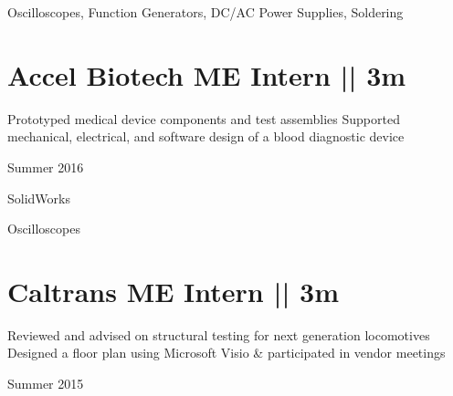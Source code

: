 {
\vspace{-2.5ex}\hspace{1.5in}
\color{cyan}\small
{Oscilloscopes, Function Generators, DC/AC Power Supplies, Soldering} %
}

\vspace{0.8ex}
\section
{\textbf{Accel Biotech}
\newline
ME Intern || 3m}

\BulletItem
\vspace{-2.5ex}
\begin{detail}
\BulletItem
Prototyped medical device components and test assemblies
\BulletItem
Supported mechanical, electrical, and software design of a blood diagnostic device
\end{detail}

\begin{subtitle}
\vspace{-7.8ex}
{{Summer 2016}}
\end{subtitle}
\vspace{0ex}

{
\vspace{0.5ex}
\color{cyan}\small
{SolidWorks} %
}

{
\vspace{-2.5ex}\hspace{3.17in}
\color{cyan}\small
{Oscilloscopes} %
}

\vspace{0.8ex}
\section
{\textbf{Caltrans}
\newline
ME Intern || 3m
\newline
}

\BulletItem
\vspace{-2.5ex}
\begin{detail}
\BulletItem
Reviewed and advised on structural testing for next generation locomotives
\BulletItem
Designed a floor plan using {\color{cyan}Microsoft Visio} \& participated in vendor meetings
\end{detail}

\begin{subtitle}
\vspace{-7.8ex}
{{Summer 2015}}
\end{subtitle}



